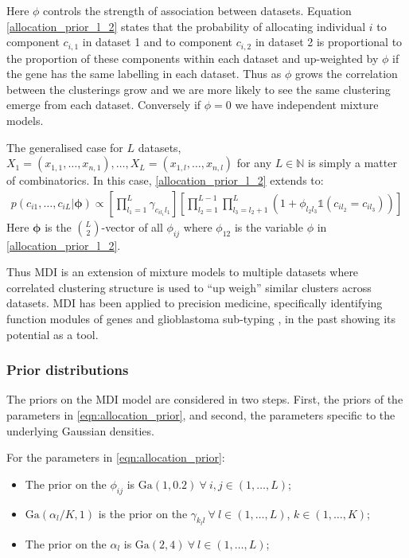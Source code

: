 \documentclass[12pt]{article} %
\begin{document}
	Here $\phi$ controls the strength of association between datasets. Equation \eqref{allocation_prior_l_2} states that the probability of allocating individual $i$ to component $c_{i,1}$ in dataset 1 and to component $c_{i,2}$ in dataset 2 is proportional to the proportion of these components within each dataset and up-weighted by $\phi$ if the gene has the same labelling in each dataset. Thus as $\phi$ grows the correlation between the clusterings grow and we are more likely to see the same clustering emerge from each dataset. Conversely if $\phi = 0$ we have independent mixture models. 
	
	The generalised case for $L$ datasets, $X_1 = (x_{1,1},\ldots,x_{n,1}),\ldots, X_L = (x_{1,l},\ldots,x_{n,l})$ for any $L \in \mathbb{N}$ is simply a matter of combinatorics. In this case, \eqref{allocation_prior_l_2} extends to:
	\begin{align} \label{eqn:allocation_prior}
	p(c_{i1},\ldots,c_{iL} | \boldsymbol{\phi}) \propto \left[\prod_{l_1=1}^L\gamma_{c_{il_1}l_1} \right]\left[\prod_{l_2=1}^{L-1}\prod_{l_3=l_2+1}^L\left(1+\phi_{l_2l_3}\mathbb{1}(c_{il_2} = c_{il_3}) \right)\right]
	\end{align}
	Here $\boldsymbol{\phi}$ is the ${L \choose 2}$-vector of all $\phi_{ij}$ where $\phi_{12}$ is the variable $\phi$ in \eqref{allocation_prior_l_2}.

	Thus MDI is an extension of mixture models to multiple datasets where correlated clustering structure is used to ``up weigh'' similar clusters across datasets. MDI has been applied to precision medicine, specifically identifying function modules of genes and glioblastoma sub-typing \cite{SavageIdentifyingcancersubtypes2013a}, in the past showing its potential as a tool.
	
	\subsubsection{Prior distributions}
	The priors on the MDI model are considered in two steps. First, the priors of the parameters in \eqref{eqn:allocation_prior}, and second, the parameters specific to the underlying Gaussian densities.
	
	For the parameters in \eqref{eqn:allocation_prior}:
	\begin{itemize}
		\item The prior on the $\phi_{ij}$ is $\text{Ga}(1, 0.2) \: \forall \: i,j \in (1, \ldots, L)$; 
		\item $\text{Ga}(\alpha_l / K, 1)$ is the prior on the $\gamma_{k_ll}  \: \forall \: l \in (1, \ldots, L)$, $k \in (1,\ldots, K)$;
		\item The prior on the $\alpha_l$ is $\text{Ga}(2,4) \: \forall \: l \in (1,\ldots,L)$;
	\end{itemize}
\end{document}
